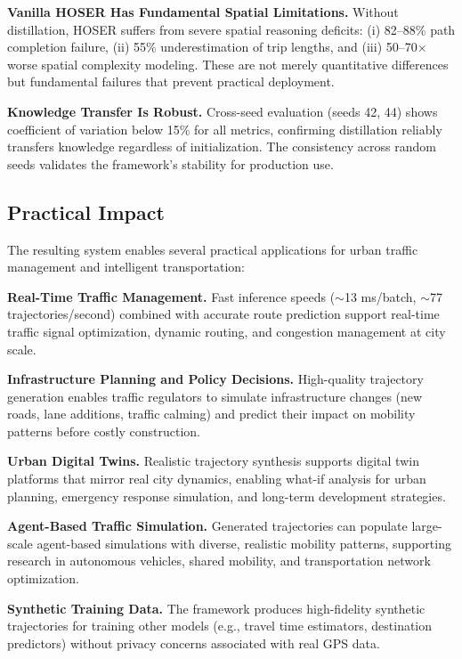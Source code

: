 \textbf{Vanilla HOSER Has Fundamental Spatial Limitations.} Without distillation, HOSER suffers from severe spatial reasoning deficits: (i) 82--88\% path completion failure, (ii) 55\% underestimation of trip lengths, and (iii) 50--70$\times$ worse spatial complexity modeling. These are not merely quantitative differences but fundamental failures that prevent practical deployment.

\textbf{Knowledge Transfer Is Robust.} Cross-seed evaluation (seeds 42, 44) shows coefficient of variation below 15\% for all metrics, confirming distillation reliably transfers knowledge regardless of initialization. The consistency across random seeds validates the framework's stability for production use.

\subsection{Practical Impact}
\label{sec:conclusion-impact}

The resulting system enables several practical applications for urban traffic management and intelligent transportation:

\textbf{Real-Time Traffic Management.} Fast inference speeds ($\sim$13 ms/batch, $\sim$77 trajectories/second) combined with accurate route prediction support real-time traffic signal optimization, dynamic routing, and congestion management at city scale.

\textbf{Infrastructure Planning and Policy Decisions.} High-quality trajectory generation enables traffic regulators to simulate infrastructure changes (new roads, lane additions, traffic calming) and predict their impact on mobility patterns before costly construction.

\textbf{Urban Digital Twins.} Realistic trajectory synthesis supports digital twin platforms that mirror real city dynamics, enabling what-if analysis for urban planning, emergency response simulation, and long-term development strategies.

\textbf{Agent-Based Traffic Simulation.} Generated trajectories can populate large-scale agent-based simulations with diverse, realistic mobility patterns, supporting research in autonomous vehicles, shared mobility, and transportation network optimization.

\textbf{Synthetic Training Data.} The framework produces high-fidelity synthetic trajectories for training other models (e.g., travel time estimators, destination predictors) without privacy concerns associated with real GPS data.

